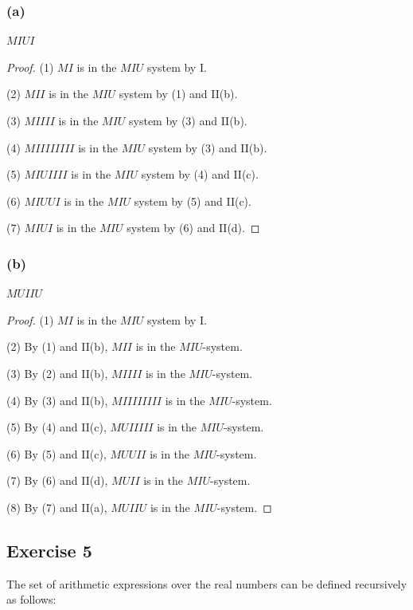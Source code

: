 \documentclass[14pt]{extarticle}
\begin{document}
\subsubsection{(a)}
$M I U I$

\begin{proof}
(1) $M I$ is in the $M I U$ system by I.

(2) $M I I$ is in the $M I U$ system by (1) and II(b).

(3) $M I I I I$ is in the $M I U$ system by (3) and II(b).

(4) $M I I I I I I I I$ is in the $M I U$ system by (3) and II(b).

(5) $M I U I I I I$ is in the $M I U$ system by (4) and II(c).

(6) $M I U U I$ is in the $M I U$ system by (5) and II(c).

(7) $M I U I$ is in the $M I U$ system by (6) and II(d).
\end{proof}

\subsubsection{(b)}
$M U I I U$

\begin{proof}
(1) $M I$ is in the $M I U$ system by I.

(2) By (1) and II(b), $M I I$ is in the $M I U$-system.

(3) By (2) and II(b), $M I I I I$ is in the $M I U$-system.

(4) By (3) and II(b), $M I I I I I I I I$ is in the $M I U$-system.

(5) By (4) and II(c), $M U I I I I I$ is in the $M I U$-system.

(6) By (5) and II(c), $M U U I I$ is in the $M I U$-system.

(7) By (6) and II(d), $M U I I$ is in the $M I U$-system.

(8) By (7) and II(a), $M U I I U$ is in the $M I U$-system.

\end{proof}

\subsection{Exercise 5}
The set of arithmetic expressions over the real numbers can be defined recursively as follows:
\end{document}
